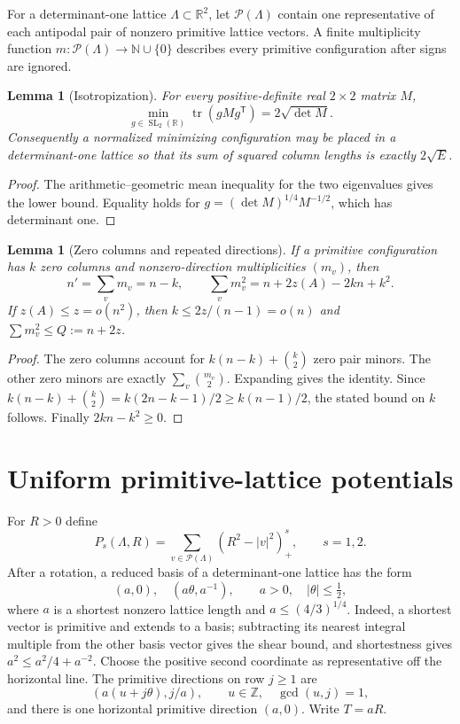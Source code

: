 \documentclass[11pt]{article}
\newtheorem{lemma}[theorem]{Lemma}
\theoremstyle{remark}\newtheorem{remark}[theorem]{Remark}
\newcommand{\Z}{\mathbb Z}\newcommand{\R}{\mathbb R}\newcommand{\N}{\mathbb N}
\newcommand{\PP}{\mathcal P}\newcommand{\tr}{\operatorname{tr}}
\begin{document}
For a determinant-one lattice $\Lambda\subset\R^2$, let $\PP(\Lambda)$ contain one representative of each antipodal pair of nonzero primitive lattice vectors. A finite multiplicity function $m:\PP(\Lambda)\to\N\cup\{0\}$ describes every primitive configuration after signs are ignored.

\begin{lemma}[Isotropization]\label{lem:trace}
For every positive-definite real $2\times2$ matrix $M$,
\[
 \min_{g\in\operatorname{SL}_2(\R)}\tr(gMg^{\mathsf T})=2\sqrt{\det M}.
\]
Consequently a normalized minimizing configuration may be placed in a determinant-one lattice so that its sum of squared column lengths is exactly $2\sqrt{E}$.
\end{lemma}
\begin{proof}
The arithmetic--geometric mean inequality for the two eigenvalues gives the lower bound. Equality holds for $g=(\det M)^{1/4}M^{-1/2}$, which has determinant one.
\end{proof}

\begin{lemma}[Zero columns and repeated directions]\label{lem:budget}
If a primitive configuration has $k$ zero columns and nonzero-direction multiplicities $(m_v)$, then
\[
 n'=\sum_v m_v=n-k,\qquad
 \sum_v m_v^2=n+2z(A)-2kn+k^2.
\]
If $z(A)\le z=o(n^2)$, then $k\le2z/(n-1)=o(n)$ and $\sum m_v^2\le Q:=n+2z$.
\end{lemma}
\begin{proof}
The zero columns account for $k(n-k)+\binom{k}{2}$ zero pair minors. The other zero minors are exactly $\sum_v\binom{m_v}{2}$. Expanding gives the identity. Since $k(n-k)+\binom{k}{2}=k(2n-k-1)/2\ge k(n-1)/2$, the stated bound on $k$ follows. Finally $2kn-k^2\ge0$.
\end{proof}

\section{Uniform primitive-lattice potentials}
For $R>0$ define
\[
 P_s(\Lambda,R)=\sum_{v\in\PP(\Lambda)}(R^2-|v|^2)_+^s,\qquad s=1,2.
\]
After a rotation, a reduced basis of a determinant-one lattice has the form
\[
 (a,0),\quad(a\theta,a^{-1}),\qquad a>0,\quad |\theta|\le\tfrac12,
\]
where $a$ is a shortest nonzero lattice length and $a\le(4/3)^{1/4}$. Indeed, a shortest vector is primitive and extends to a basis; subtracting its nearest integral multiple from the other basis vector gives the shear bound, and shortestness gives $a^2\le a^2/4+a^{-2}$.
Choose the positive second coordinate as representative off the horizontal line. The primitive directions on row $j\ge1$ are
\[
 (a(u+j\theta),j/a),\qquad u\in\Z,\quad\gcd(u,j)=1,
\]
and there is one horizontal primitive direction $(a,0)$. Write $T=aR$.
\end{document}

